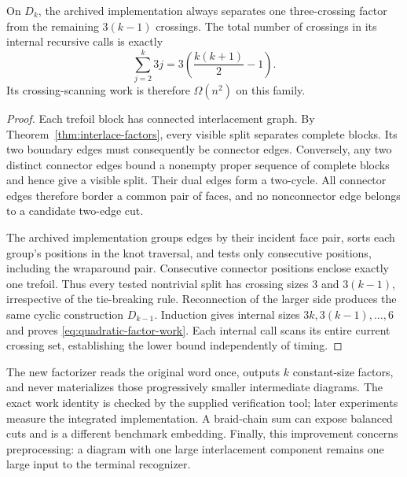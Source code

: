 \begin{theorem}
\label{thm:quadratic-factor-family}
On $D_k$, the archived  implementation always separates
one three-crossing factor from the remaining $3(k-1)$ crossings.  The total
number of crossings in its internal recursive calls is exactly
\begin{equation}
\label{eq:quadratic-factor-work}
\sum_{j=2}^{k}3j
=3\left(\frac{k(k+1)}2-1\right).
\end{equation}
Its crossing-scanning work is therefore $\Omega(n^2)$ on this family.
\end{theorem}

\begin{proof}
Each trefoil block has connected interlacement graph.  By
Theorem~\ref{thm:interlace-factors}, every visible split separates complete
blocks.  Its two boundary edges must consequently be connector edges.
Conversely, any two distinct connector edges bound a nonempty proper
sequence of complete blocks and hence give a visible split.  Their dual
edges form a two-cycle.  All connector edges therefore border a common
pair of faces, and no nonconnector edge belongs to a candidate two-edge cut.

The archived implementation groups edges by their incident face pair,
sorts each group's positions in the knot traversal, and tests only consecutive
positions, including the wraparound pair.  Consecutive connector positions
enclose exactly one trefoil.  Thus every tested nontrivial split has crossing
sizes $3$ and $3(k-1)$, irrespective of the tie-breaking rule.  Reconnection
of the larger side produces the same cyclic construction $D_{k-1}$.
Induction gives internal sizes $3k,3(k-1),\ldots,6$ and proves
\eqref{eq:quadratic-factor-work}.  Each internal call scans its entire
current crossing set, establishing the lower bound independently of timing.
\end{proof}

The new factorizer reads the original word once, outputs $k$ constant-size
factors, and never materializes those progressively smaller intermediate
diagrams.  The exact work identity is checked by the supplied verification
tool; later experiments measure the integrated implementation.  A braid-chain
sum can expose balanced cuts and is a different benchmark embedding.
Finally, this improvement concerns preprocessing: a diagram with one large
interlacement component remains one large input to the terminal recognizer.
